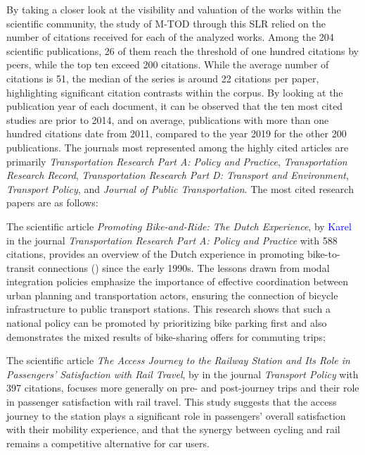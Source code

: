 \begin{refsegment}
By taking a closer look at the visibility and valuation of the works within the scientific community, the study of \acrshort{M-TOD} through this \acrshort{SLR} relied on the number of citations received for each of the analyzed works. Among the 204 scientific publications, 26 of them reach the threshold of one hundred citations by peers, while the top ten exceed 200 citations. While the average number of citations is 51, the median of the series is around 22 citations per paper, highlighting significant citation contrasts within the corpus. By looking at the publication year of each document, it can be observed that the ten most cited studies are prior to 2014, and on average, publications with more than one hundred citations date from 2011, compared to the year 2019 for the other 200 publications. The journals most represented among the highly cited articles are primarily \foreignlanguage{english}{\textsl{Transportation Research Part A: Policy and Practice}}, \textsl{Transportation Research Record}, \foreignlanguage{english}{\textsl{Transportation Research Part D: Transport and Environment}}, \textsl{Transport Policy}, and \textsl{Journal of Public Transportation}. The most cited research papers are as follows:
    \begin{customitemize}
\item The scientific article \foreignlanguage{english}{\textsl{Promoting Bike-and-Ride: The Dutch Experience}}, by \textcolor{blue}{Karel} \textcolor{blue}{\textcite[328, 330, 335]{martens_promoting_2007}} in the journal \foreignlanguage{english}{\textsl{Transportation Research Part A: Policy and Practice}} with 588 citations, provides an overview of the Dutch experience in promoting bike-to-transit connections () since the early 1990s. The lessons drawn from modal integration policies emphasize the importance of effective coordination between urban planning and transportation actors, ensuring the connection of bicycle infrastructure to public transport stations. This research shows that such a national policy can be promoted by prioritizing bike parking first and also demonstrates the mixed results of bike-sharing offers for commuting trips;
\item The scientific article \textsl{The Access Journey to the Railway Station and Its Role in Passengers’ Satisfaction with Rail Travel}, by \textcolor{blue}{\textcite[359, 362, 363]{givoni_access_2007}} in the journal \textsl{Transport Policy} with 397 citations, focuses more generally on pre- and post-journey trips and their role in passenger satisfaction with rail travel. This study suggests that the access journey to the station plays a significant role in passengers' overall satisfaction with their mobility experience, and that the synergy between cycling and rail remains a competitive alternative for car users.
    \end{customitemize}%


\end{refsegment}
